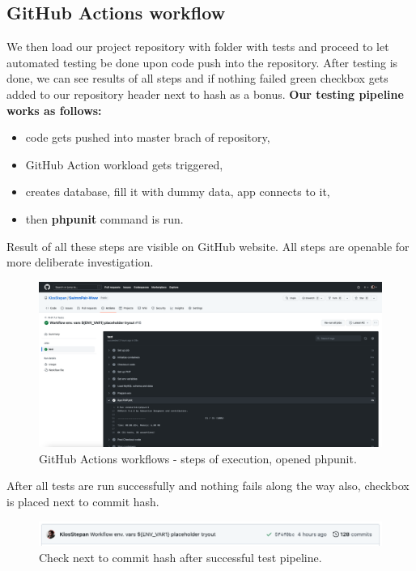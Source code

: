 \subsection{GitHub Actions workflow}
We then load our project repository with folder with tests and proceed to let automated testing be done upon code push into the repository. After testing is done, we can see results of all steps and if nothing failed green checkbox gets added to our repository header next to hash as a bonus.   
\newline
\textbf{Our testing pipeline works as follows:}
\begin{itemize}
    \item code gets pushed into master brach of repository,
    \item GitHub Action workload gets triggered,
    \item creates database, fill it with dummy data, app connects to it,
    \item then \textbf{phpunit} command is run.
\end{itemize} 
Result of all these steps are visible on GitHub website. All steps are openable for more deliberate investigation.
\begin{figure}[h]	
    \centering	
    \includegraphics[scale=0.205]{img/phpunit_actionswf.png}
    \caption{GitHub Actions workflows - steps of execution, opened phpunit.}
    \label{fig4.4:phpunitghactionswf}
\end{figure}
\newline
After all tests are run successfully and nothing fails along the way also, checkbox is placed next to commit hash.
\begin{figure}[h]	
    \centering	
    \includegraphics[scale=0.435]{img/phpunit_actionscheck.png}
    \caption{Check next to commit hash after successful test pipeline.}
    \label{fig4.5:phpunitghactioncheck}
\end{figure}
